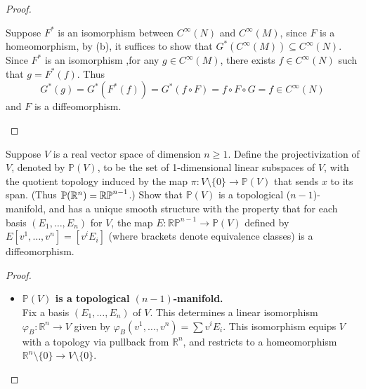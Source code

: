 \begin{problem}
\begin{proof}
\begin{enumerate}
            Suppose $F^*$ is an isomorphism between $C^\infty(N)$ and $C^\infty(M)$, since $F$ is a homeomorphism, by (b), it suffices to show that $G^*(C^\infty(M)) \subseteq C^\infty(N)$. Since $F^*$ is an isomorphism ,for any $g \in C^\infty(M)$, there exists $f \in C^\infty(N)$ such that $ g = F^*(f)$. Thus 
            $$ G^*(g) = G^*(F^*(f)) = G^*(f \circ F) = f \circ F \circ G = f \in C^\infty(N)$$
            and $F$ is a diffeomorphism.
        \end{enumerate}
    \end{proof}
\end{problem}

\begin{problem}
    Suppose $V$ is a real vector space of dimension $n \geq 1$. 
    Define the projectivization of $V$, denoted by $\mathbb{P}(V)$, to be the set of 1-dimensional linear subspaces of $V$, with the quotient topology induced by the map $\pi \colon V \setminus \{0\} \to \mathbb{P}(V)$ that sends $x$ to its span. 
    (Thus $\mathbb{P}(\mathbb{R}^n)= \mathbb{RP}^{n-1}$.) Show that $\mathbb{P}(V)$ is a topological ($n-1$)-manifold, and has a unique smooth structure with the property that for each basis $(E_1, \dots, E_n)$ for $V$, the map $E \colon \mathbb{RP}^{n-1} \to \mathbb{P}(V)$ defined by $E[v^1, \dots, v^n] = [v^i E_i]$ (where brackets denote equivalence classes) is a diffeomorphism.

    \begin{proof}
        \begin{itemize}
            \item \textbf{$\mathbb{P}(V)$ is a topological $(n-1)$-manifold.}\\
            Fix a basis $(E_1, \dots, E_n)$ of $V$. This determines a linear isomorphism $\varphi_B \colon \mathbb{R}^n \to V$ given by $\varphi_B(v^1, \dots, v^n) = \sum v^i E_i$. This isomorphism equips $V$ with a topology via pullback from $\mathbb{R}^n$, and restricts to a homeomorphism $\mathbb{R}^n \setminus \{0\} \to V \setminus \{0\}$.


\end{itemize}
\end{proof}
\end{problem}
